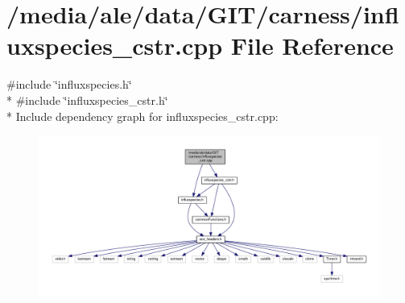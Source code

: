 \hypertarget{a00077}{\section{/media/ale/data/\-G\-I\-T/carness/influxspecies\-\_\-cstr.cpp File Reference}
\label{a00077}
}
{\ttfamily \#include \char`\"{}influxspecies.\-h\char`\"{}}\\*
{\ttfamily \#include \char`\"{}influxspecies\-\_\-cstr.\-h\char`\"{}}\\*
Include dependency graph for influxspecies\-\_\-cstr.\-cpp\-:\nopagebreak
\begin{figure}[H]
\begin{center}
\leavevmode
\includegraphics[width=350pt]{a00148}
\end{center}
\end{figure}
